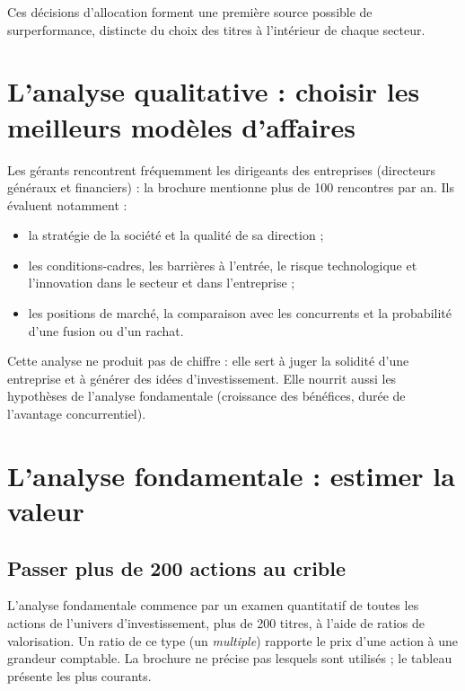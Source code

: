 \documentclass[11pt,a4paper]{article}
\begin{document}
Ces décisions d'allocation forment une première source possible de surperformance, distincte du choix des titres à l'intérieur de chaque secteur.

\section{L'analyse qualitative : choisir les meilleurs modèles d'affaires}

Les gérants rencontrent fréquemment les dirigeants des entreprises (directeurs généraux et financiers) : la brochure mentionne plus de 100 rencontres par an. Ils évaluent notamment :
\begin{itemize}[leftmargin=*]
  \item la stratégie de la société et la qualité de sa direction ;
  \item les conditions-cadres, les barrières à l'entrée, le risque technologique et l'innovation dans le secteur et dans l'entreprise ;
  \item les positions de marché, la comparaison avec les concurrents et la probabilité d'une fusion ou d'un rachat.
\end{itemize}
Cette analyse ne produit pas de chiffre : elle sert à juger la solidité d'une entreprise et à générer des idées d'investissement. Elle nourrit aussi les hypothèses de l'analyse fondamentale (croissance des bénéfices, durée de l'avantage concurrentiel).

\section{L'analyse fondamentale : estimer la valeur}

\subsection{Passer plus de 200 actions au crible}

L'analyse fondamentale commence par un examen quantitatif de toutes les actions de l'univers d'investissement, plus de 200 titres, à l'aide de ratios de valorisation. Un ratio de ce type (un \emph{multiple}) rapporte le prix d'une action à une grandeur comptable. La brochure ne précise pas lesquels sont utilisés ; le tableau présente les plus courants.
\end{document}
